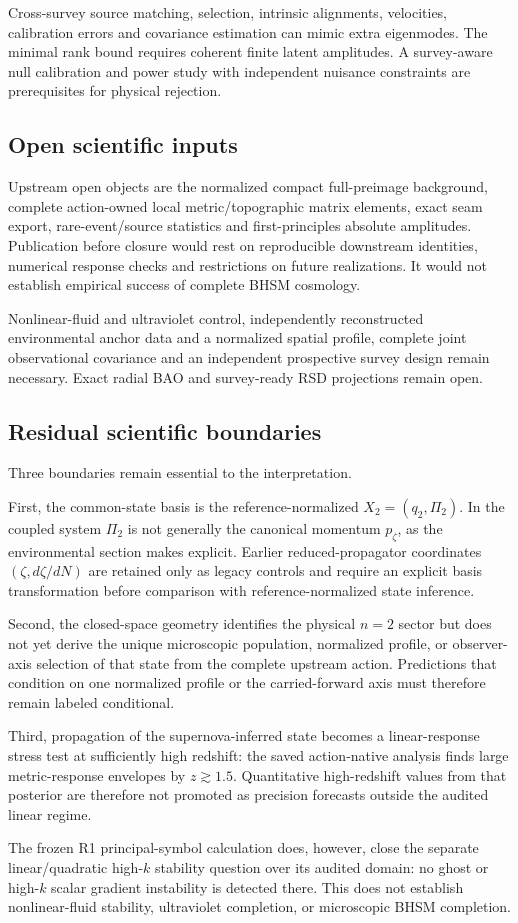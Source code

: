 Cross-survey source matching, selection, intrinsic alignments, velocities,
calibration errors and covariance estimation can mimic extra eigenmodes.
The minimal rank bound requires coherent finite latent amplitudes.
A survey-aware null calibration and power study with independent nuisance
constraints are prerequisites for physical rejection.

\subsection{Open scientific inputs}
Upstream open objects are the normalized compact full-preimage background,
complete action-owned local metric/topographic matrix elements, exact seam
export, rare-event/source statistics and first-principles absolute amplitudes.
Publication before closure would rest on reproducible downstream identities,
numerical response checks and restrictions on future realizations.
It would not establish empirical success of complete BHSM cosmology.

Nonlinear-fluid and ultraviolet control, independently reconstructed
environmental anchor data and a normalized spatial profile, complete joint
observational covariance and an independent prospective survey design remain
necessary. Exact radial BAO and survey-ready RSD projections remain open.

\subsection{Residual scientific boundaries}
Three boundaries remain essential to the interpretation.

First, the common-state basis is the reference-normalized
$X_2=(q_2,\Pi_2)$. In the coupled system $\Pi_2$ is not generally the
canonical momentum $p_\zeta$, as the environmental section makes explicit.  Earlier reduced-propagator coordinates
$(\zeta,d\zeta/dN)$ are retained only as legacy controls and require an
explicit basis transformation before comparison with reference-normalized state
inference.

Second, the closed-space geometry identifies the physical $n=2$ sector but
does not yet derive the unique microscopic population, normalized profile, or
observer-axis selection of that state from the complete upstream action.
Predictions that condition on one normalized profile or the carried-forward
axis must therefore remain labeled conditional.

Third, propagation of the supernova-inferred state becomes a linear-response
stress test at sufficiently high redshift: the saved action-native analysis
finds large metric-response envelopes by $z\gtrsim1.5$.  Quantitative
high-redshift values from that posterior are therefore not promoted as
precision forecasts outside the audited linear regime.

The frozen R1 principal-symbol calculation does, however, close the separate
linear/quadratic high-$k$ stability question over its audited domain: no ghost
or high-$k$ scalar gradient instability is detected there.  This does not
establish nonlinear-fluid stability, ultraviolet completion, or microscopic
BHSM completion.
